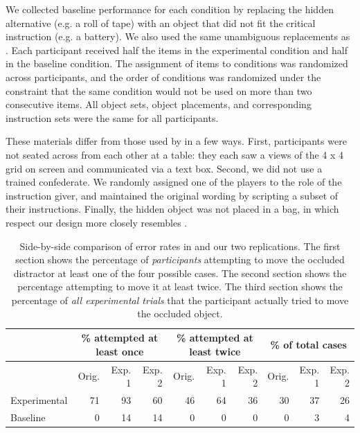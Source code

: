 \documentclass[10pt,letterpaper]{article}
\begin{document}
We collected baseline performance for each condition by replacing the hidden alternative (e.g. a roll of tape) with an object that did not fit the critical instruction (e.g. a battery). We also used the same unambiguous replacements as . Each participant received half the items in the experimental condition and half in the baseline condition. The assignment of items to conditions was randomized across participants, and the order of conditions was randomized under the constraint that the same condition would not be used on more than two consecutive items. All object sets, object placements, and corresponding instruction sets were the same for all participants.

These materials differ from those used by  in a few ways. First, participants were not seated across from each other at a table: they each saw a views of the 4 x 4 grid on screen and communicated via a text box. Second, we did not use a trained confederate. We randomly assigned one of the players to the role of the instruction giver, and maintained the original wording by scripting a subset of their instructions. Finally, the hidden object was not placed in a bag, in which respect our design more closely resembles .

\begin{table}
\begin{center}
\begin{tabular}{ p{2cm} | r | r |  r || r | r | r || r | r | r}
& \multicolumn{3}{c||}{\% attempted at least once} & \multicolumn{3}{c||}{\% attempted at least twice} & \multicolumn{3}{c}{\% of total cases}\\
\hline
& Orig. & Exp. 1 & Exp. 2 & Orig. & Exp. 1 & Exp. 2 & Orig. & Exp. 1 & Exp. 2  \\
Experimental & 71 & 93 & 60 & 46 & 64 & 36 & 30 & 37 & 26\\
Baseline & 0 & 14 & 14 & 0 & 0 & 0 & 0 & 3 & 4\\
\end{tabular}
\caption{Side-by-side comparison of error rates in  and our two replications. The first section shows the percentage of \emph{participants} attempting to move the occluded distractor at least one of the four possible cases. The second section shows the percentage attempting to move it at least twice. The third section shows the percentage of \emph{all experimental trials} that the participant actually tried to move the occluded object. }
\label{table:mainResults}
\end{center}
\end{table}
\end{document}
